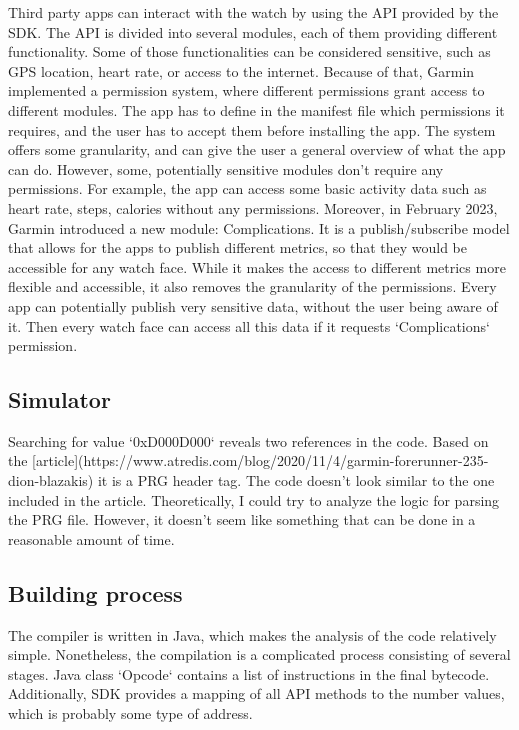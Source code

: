Third party apps can interact with the watch by using the API provided by the SDK.
The API is divided into several modules, each of them providing different functionality.
Some of those functionalities can be considered sensitive, such as GPS location, heart rate, or access to the internet.
Because of that, Garmin implemented a permission system, where different permissions grant access to different modules.
The app has to define in the manifest file which permissions it requires, and the user has to accept them before installing the app.
The system offers some granularity, and can give the user a general overview of what the app can do.
However, some, potentially sensitive modules don't require any permissions.
For example, the app can access some basic activity data such as heart rate, steps, calories without any permissions.
Moreover, in February 2023, Garmin introduced a new module: Complications.
It is a publish/subscribe model that allows for the apps to publish different metrics, so that they would be accessible for any watch face.
While it makes the access to different metrics more flexible and accessible, it also removes the granularity of the permissions.
Every app can potentially publish very sensitive data, without the user being aware of it.
Then every watch face can access all this data if it requests `Complications` permission.

\subsection{Simulator}
Searching for value `0xD000D000` reveals two references in the code.
Based on the [article](https://www.atredis.com/blog/2020/11/4/garmin-forerunner-235-dion-blazakis) it is a PRG header tag.
The code doesn't look similar to the one included in the article.
Theoretically, I could try to analyze the logic for parsing the PRG file.
However, it doesn't seem like something that can be done in a reasonable amount of time.
\subsection{Building process}
The compiler is written in Java, which makes the analysis of the code relatively simple.
Nonetheless, the compilation is a complicated process consisting of several stages.
Java class `Opcode` contains a list of instructions in the final bytecode.
Additionally, SDK provides a mapping of all API methods to the number values, which is probably some type of address.

